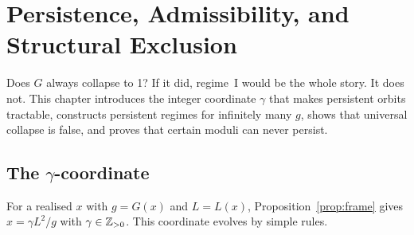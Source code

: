 \chapter{Persistence, Admissibility, and Structural Exclusion}\label{ch:persist}

Does \(G\) always collapse to 1? If it did, regime~I would be the whole story. It does not. This chapter introduces the integer coordinate \(\gamma\) that makes persistent orbits tractable, constructs persistent regimes for infinitely many \(g\), shows that universal collapse is false, and proves that certain moduli can never persist.

\section{\texorpdfstring{The \(\gamma\)-coordinate}{The gamma-coordinate}}

For a realised \(x\) with \(g=G(x)\) and \(L=L(x)\), Proposition~\ref{prop:frame} gives \(x=\gamma L^2/g\) with \(\gamma\in\mathbb{Z}_{>0}\). This coordinate evolves by simple rules.

